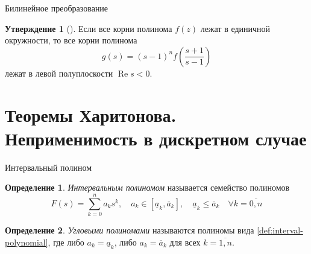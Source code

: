 \documentclass[notheorems,aspectratio=169]{beamer}
\theoremstyle{definition}
\newtheorem{definition}{Определение}
\newtheorem{proposition}{Утверждение}
\newcommand{\paren}[1]{\left( #1 \right)}
\renewcommand{\Re}{\operatorname{Re}}
\begin{document}
\begin{frame}{Билинейное преобразование}
  \begin{proposition}[{\cite[с.~1214]{KrausAndersonMansour1988}}]
    Если все корни полинома $f(z)$ лежат в единичной окружности, то все корни полинома
    \begin{equation*}
      g(s) = (s - 1)^n f\paren{\frac{s+1}{s-1}}
    \end{equation*}
    лежат в левой полуплоскости $\Re{s} < 0$.
  \end{proposition}
\end{frame}

\section{Теоремы Харитонова. Неприменимость в дискретном случае}

\begin{frame}{Интервальный полином}
  \begin{definition}
    \textit{Интервальным полиномом} называется семейство полиномов
    \begin{equation}\label{def:interval-polynomial}
      F(s) = \sum_{k=0}^n a_k s^k,
      \quad a_k \in [\underline{a}_k, \overline{a}_k],
      \quad \underline{a}_k \leqslant \overline{a}_k
      \quad \forall k=\overline{0,n}
    \end{equation}
  \end{definition}

  \begin{definition}
    \textit{Угловыми полиномами} называются полиномы вида
    \eqref{def:interval-polynomial}, где либо \(a_k = \underline{a}_k\), либо
    \(a_k = \overline{a}_k\) для всех \(k=\overline{1,n}\).
  \end{definition}
\end{frame}
\end{document}
